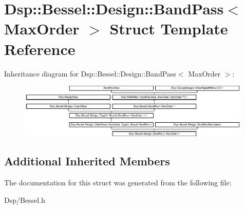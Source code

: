 \hypertarget{structDsp_1_1Bessel_1_1Design_1_1BandPass}{\section{Dsp\-:\-:Bessel\-:\-:Design\-:\-:Band\-Pass$<$ Max\-Order $>$ Struct Template Reference}
\label{structDsp_1_1Bessel_1_1Design_1_1BandPass}
}
Inheritance diagram for Dsp\-:\-:Bessel\-:\-:Design\-:\-:Band\-Pass$<$ Max\-Order $>$\-:\begin{figure}[H]
\begin{center}
\leavevmode
\includegraphics[height=2.598608cm]{structDsp_1_1Bessel_1_1Design_1_1BandPass}
\end{center}
\end{figure}
\subsection*{Additional Inherited Members}


The documentation for this struct was generated from the following file\-:\begin{DoxyCompactItemize}
\item 
Dsp/Bessel.\-h\end{DoxyCompactItemize}

